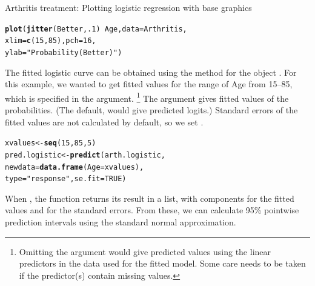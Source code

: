 \documentclass[11pt]{book}\usepackage[]{graphicx}\usepackage[]{color}
\makeatletter
\newcommand{\hlnum}[1]{\textcolor[rgb]{0.686,0.059,0.569}{#1}}%
\newcommand{\hlstr}[1]{\textcolor[rgb]{0.192,0.494,0.8}{#1}}%
\newcommand{\hlopt}[1]{\textcolor[rgb]{0,0,0}{#1}}%
\newcommand{\hlstd}[1]{\textcolor[rgb]{0.345,0.345,0.345}{#1}}%
\newcommand{\hlkwb}[1]{\textcolor[rgb]{0.69,0.353,0.396}{#1}}%
\newcommand{\hlkwc}[1]{\textcolor[rgb]{0.333,0.667,0.333}{#1}}%
\newcommand{\hlkwd}[1]{\textcolor[rgb]{0.737,0.353,0.396}{\textbf{#1}}}%
\newenvironment{kframe}{%
 \def\at@end@of@kframe{}%
 \ifinner\ifhmode%
  \def\at@end@of@kframe{\end{minipage}}%
  \begin{minipage}{\columnwidth}%
 \fi\fi%
 \def\FrameCommand##1{\hskip\@totalleftmargin \hskip-\fboxsep
 \colorbox{shadecolor}{##1}\hskip-\fboxsep
     \hskip-\linewidth \hskip-\@totalleftmargin \hskip\columnwidth}%
 \MakeFramed {\advance\hsize-\width
   \@totalleftmargin\z@ \linewidth\hsize
   \@setminipage}}%
 {\par\unskip\endMakeFramed%
 \at@end@of@kframe}
\newenvironment{knitrout}{}{} %
\renewenvironment{knitrout}{\small\renewcommand{\baselinestretch}{.85}}{} %
\makeatother
\begin{document}
\begin{Example}[arthrit7]{Arthritis treatment: Plotting logistic regression with base graphics}
\begin{knitrout}
\color{fgcolor}\begin{kframe}
\begin{alltt}
\hlkwd{plot}\hlstd{(}\hlkwd{jitter}\hlstd{(Better,} \hlnum{.1}\hlstd{)} \hlopt{~} \hlstd{Age,} \hlkwc{data}\hlstd{=Arthritis,}
     \hlkwc{xlim} \hlstd{=} \hlkwd{c}\hlstd{(}\hlnum{15}\hlstd{,}\hlnum{85}\hlstd{),} \hlkwc{pch}\hlstd{=}\hlnum{16}\hlstd{,}
     \hlkwc{ylab}\hlstd{=}\hlstr{"Probability (Better)"}\hlstd{)}
\end{alltt}
\end{kframe}
\end{knitrout}
The fitted logistic curve can be obtained using the  method for the
 object .  For this example, we wanted to
get fitted values for the range of Age from 15--85, which is specified
in the  argument.%
\footnote{
Omitting the  argument would give predicted values using the 
linear predictors in the data used for the fitted model.
Some care needs to be taken if the predictor(s) contain missing values.
}
The argument 
gives fitted values of the probabilities. (The default,  would
give predicted logits.)  Standard errors of the fitted values are not calculated
by default, so we set .
\begin{knitrout}
\color{fgcolor}\begin{kframe}
\begin{alltt}
\hlstd{xvalues} \hlkwb{<-} \hlkwd{seq}\hlstd{(}\hlnum{15}\hlstd{,} \hlnum{85}\hlstd{,} \hlnum{5}\hlstd{)}
\hlstd{pred.logistic} \hlkwb{<-} \hlkwd{predict}\hlstd{(arth.logistic,}
                         \hlkwc{newdata}\hlstd{=}\hlkwd{data.frame}\hlstd{(}\hlkwc{Age}\hlstd{=xvalues),}
                         \hlkwc{type}\hlstd{=}\hlstr{"response"}\hlstd{,} \hlkwc{se.fit}\hlstd{=}\hlnum{TRUE}\hlstd{)}
\end{alltt}
\end{kframe}
\end{knitrout}
When ,
the  function returns its result in a list, with components 
for the fitted values and  for the standard errors.
From these, we can calculate 95\% pointwise prediction intervals
using the standard normal approximation.
\begin{knitrout}
\color{fgcolor}\begin{kframe}

\end{kframe}
\end{knitrout}
\end{Example}
\end{document}
